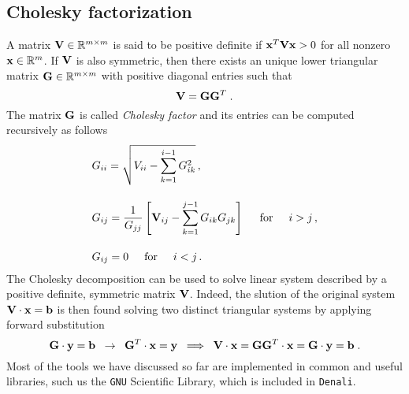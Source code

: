 \subsection{Cholesky factorization}
A matrix $\mathbf{V}\in \mathbb{R}^{m \times m}$ is said to be positive definite if $\mathbf{x}^T \mathbf{V} \mathbf{x} > 0$ for all nonzero $\mathbf{x} \in \mathbb{R}^{m}$. If $\mathbf{V}$ is also symmetric, then there exists an unique lower triangular matrix $\mathbf{G} \in \mathbb{R}^{m \times m}$ with positive diagonal entries such that
\begin{equation*}
    \mathbf{V} = \mathbf{G} \mathbf{G}^T \;.
\end{equation*}
The matrix $\mathbf{G}$ is called \textit{Cholesky factor} and its entries can be computed recursively as follows
\begin{align}
    &G_{ii} = \sqrt{V_{ii} - \sum_{k=1}^{i-1} G_{ik}^2}\,,\\[10pt]
    & G_{ij} = \frac{1}{G_{jj}} \left[ \mathbf{V}_{ij} - \sum_{k=1}^{j-1} G_{ik} G_{jk}\right] \hspace{5mm} \textrm{for} \hspace{5mm} i>j \,,\\[10pt]
    &G_{ij} = 0 \hspace{5mm} \textrm{for} \hspace{5mm} i<j \, .
\end{align}
The Cholesky decomposition can be used to solve linear system described by a positive definite, symmetric matrix $\mathbf{V}$. Indeed, the slution of the original system $\mathbf{V} \cdot \mathbf{x} = \mathbf{b}$ is then found solving two distinct triangular systems by applying forward substitution
\begin{equation*}
    \mathbf{G}\cdot \mathbf{y} = \mathbf{b} \; \; \rightarrow \; \;  \mathbf{G}^{T}\cdot \mathbf{x} = \mathbf{y} \; \; \Longrightarrow \; \; \mathbf{V} \cdot\mathbf{x} = \mathbf{G} \mathbf{G}^T \cdot \mathbf{x} = \mathbf{G} \cdot \mathbf{y} = \mathbf{b}\; .
\end{equation*}
Most of the tools we have discussed so far are implemented in common and useful libraries, such us the \texttt{GNU} Scientific Library, which is included in \texttt{Denali}.